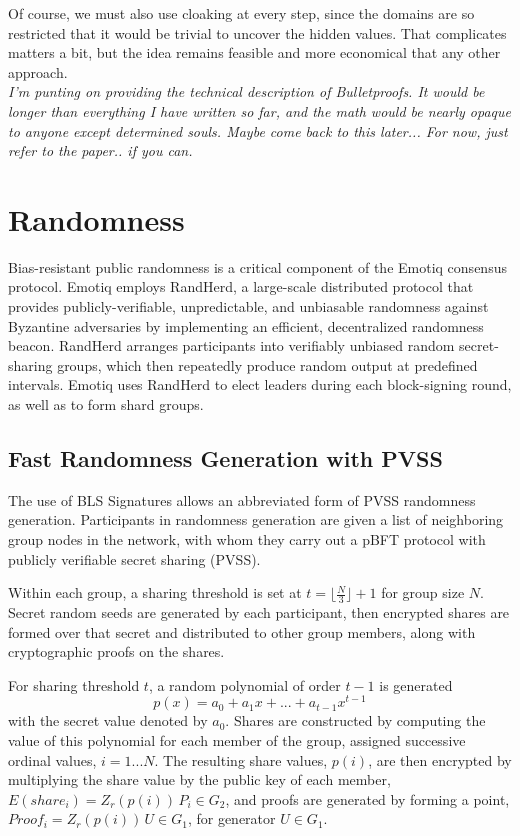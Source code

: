 \documentclass{yellowpaper}
\begin{document}
Of course, we must also use cloaking at every step, since the domains are so restricted that it would be trivial to uncover the hidden values. That complicates matters a bit, but the idea remains feasible and more economical that any other approach.
$$
$$
{\em{I'm punting on providing the technical description of Bulletproofs. It would be longer than everything I have written so far, and the math would be nearly opaque to anyone except determined souls. Maybe come back to this later... For now, just refer to the paper.. if you can.}}
$$
$$
\section{Randomness}
Bias-resistant public randomness is a critical component of the Emotiq consensus protocol. Emotiq employs RandHerd, a large-scale distributed protocol that provides publicly-verifiable, unpredictable, and unbiasable randomness against Byzantine adversaries by implementing an efficient, decentralized randomness beacon. RandHerd arranges participants into verifiably unbiased random
secret-sharing groups, which then repeatedly produce random output at predefined intervals. Emotiq uses RandHerd to elect leaders during each block-signing round, as well as to form shard groups.
\subsection{Fast Randomness Generation with PVSS}

The use of BLS Signatures allows an abbreviated form of PVSS randomness generation. Participants in randomness generation are given a list of neighboring group nodes in the network, with whom they carry out a pBFT protocol with publicly verifiable secret sharing (PVSS). 

Within each group, a sharing threshold is set at $t = \lfloor \frac{N}{3} \rfloor + 1$ for group size $N$. Secret random seeds are generated by each participant, then encrypted shares are formed over that secret and distributed to other group members, along with cryptographic proofs on the shares.

For sharing threshold $t$, a random polynomial of order $t-1$ is generated $$p(x) = a_0 + a_1 x + ... + a_{t-1} x^{t-1}$$ with the secret value denoted by $a_0$.  Shares are constructed by computing the value of this polynomial for each member of the group, assigned successive ordinal values, $i = 1 ... N$. The resulting share values, $p(i)$, are then encrypted by multiplying the share value by the public key of each member, $E(share_i) = Z_r(p(i))\, P_i \in G_2$, and proofs are generated by forming a point, $Proof_i = Z_r(p(i)) \,U \in G_1$, for generator $U \in G_1$. 
\end{document}
